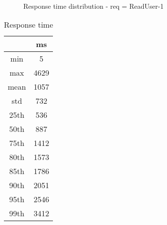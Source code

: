 \begin{minipage}{0.75\linewidth}
\begin{figure}[h]
\begin{adjustbox}{max width=1.0\linewidth, keepaspectratio}
  \end{adjustbox}
  \caption{Response time distribution - req = ReadUser-1}
\end{figure}
\end{minipage}\hfill\begin{minipage}{0.18\linewidth}
\begin{table}[h]
\begin{tabular}{|cc|}
\hline
\textbf{} & \textbf{ms}\\ \hline
 \Xhline{0.005\arrayrulewidth}
min & 5\\
 \Xhline{0.005\arrayrulewidth}
max & 4629\\
 \Xhline{0.005\arrayrulewidth}
mean & 1057\\
 \Xhline{0.005\arrayrulewidth}
std & 732\\
\hline
\hline
 \Xhline{0.005\arrayrulewidth}
25th & 536\\
 \Xhline{0.005\arrayrulewidth}
50th & 887\\
 \Xhline{0.005\arrayrulewidth}
75th & 1412\\
 \Xhline{0.005\arrayrulewidth}
80th & 1573\\
 \Xhline{0.005\arrayrulewidth}
85th & 1786\\
 \Xhline{0.005\arrayrulewidth}
90th & 2051\\
 \Xhline{0.005\arrayrulewidth}
95th & 2546\\
 \Xhline{0.005\arrayrulewidth}
99th & 3412\\
\hline
\end{tabular}
\caption{Response time}
\end{table}
\end{minipage}\hfill